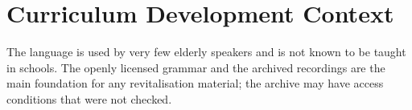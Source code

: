 \documentclass[12pt]{article}
\begin{document}
\section{Curriculum Development Context}
The language is used by very few elderly speakers and is not known to be taught in schools. The openly licensed grammar and the archived recordings are the main foundation for any revitalisation material; the archive may have access conditions that were not checked.
\end{document}
